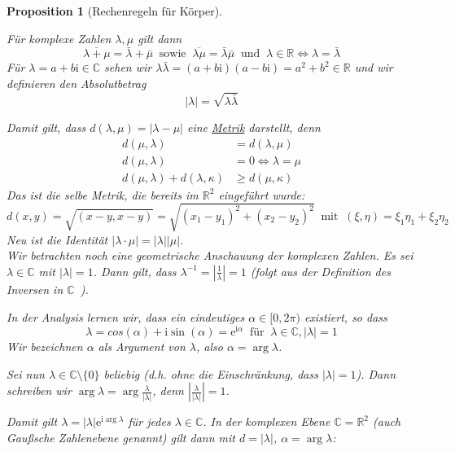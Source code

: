 \documentclass{report}
\newcommand{\lb}{\lambda}
\newcommand{\ii}{\mathrm{i}}
\newcommand{\ee}{\mathrm{e}}
\newcommand{\R}{\mathbb{R}}
\newcommand{\C}{\mathbb{C}}
\newcommand{\mC}{$\mathbb{C}$\ }
\newcommand{\al}{\alpha}
\theoremstyle{customrem}
\theoremstyle{customdef}
\newtheorem{proposition}[definition]{Proposition}
\begin{document}
\begin{proposition}[Rechenregeln für Körper]
\begin{enumerate}
				Für komplexe Zahlen $\lb, \mu$ gilt dann $$\overline{\lb + \mu} = \bar{\lb} + \bar{\mu}\ \text{ sowie }\ \overline{\lb \mu} = \bar{\lb}\bar{\mu}\ \text{ und }\ \lb \in \R \Leftrightarrow \lb = \bar{\lb}$$
				Für $\lb = a+ b\ii \in \C$ sehen wir $\lb \bar{\lb} = (a + b\ii) (a - b\ii) = a^2 + b^2 \in \R$ und wir definieren den Absolutbetrag $$|\lb| = \sqrt{\lb \bar{\lb}}$$
				
				Damit gilt, dass $d(\lb, \mu) = |\lb - \mu|$ eine \hyperref[metrikkor]{Metrik} darstellt, denn
				\begin{align*}
					d(\mu, \lb) &= d(\lb, \mu)\\
					d(\mu, \lb) &= 0 \Leftrightarrow \lb = \mu\\
					d(\mu, \lb) + d(\lb, \kappa) &\ge d(\mu, \kappa)
				\end{align*}
				Das ist die selbe Metrik, die bereits im $\R^2$ eingeführt wurde:			
				$$d(x, y) = \sqrt{(x - y, x - y)} = \sqrt{(x_1-y_1)^2 + (x_2 - y_2)^2} \ \text{ mit }\ (\xi, \eta) = \xi_1 \eta_1 + \xi_2 \eta_2$$
				Neu ist die Identität $|\lb \cdot \mu| = |\lb| |\mu|$.\\
				
				Wir betrachten noch eine geometrische Anschauung der komplexen Zahlen. Es sei $\lb \in \C$ mit $|\lb| = 1$. Dann gilt, dass $\lb^{-1} = |\frac{1}{\lb}| = 1$  (folgt aus der Definition des Inversen in \mC).
				
				In der Analysis lernen wir, dass ein eindeutiges $\al \in [0, 2\pi)$ existiert, so dass $$\lb = cos(\al) + \ii \sin(\al) = \ee^{\ii\al}\ \text{ für }\ \lb \in \C, |\lb| = 1$$
				Wir bezeichnen $\al$ als Argument von $\lb$, also $\al = \arg \lb$.
				
				Sei nun $\lb \in \C \setminus \{0\}$ beliebig (d.h. ohne die Einschränkung, dass $|\lb| = 1$). Dann schreiben wir $\arg \lb = \arg \frac{\lb}{|\lb|}$, denn $\left|\frac{\lb}{|\lb|}\right|=1$.
				
				Damit gilt $\lb = |\lb| \ee^{\ii \arg \lb}$ für jedes $\lb \in \C$. In der komplexen Ebene $\C = \R^2$ (auch Gaußsche Zahlenebene genannt) gilt dann	mit $d = |\lb|$, $\al = \arg \lb$:
				

\end{enumerate}
\end{proposition}
\end{document}
